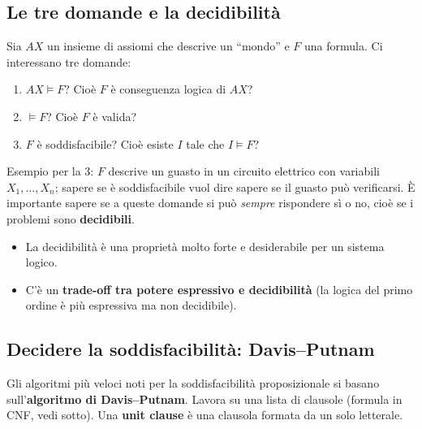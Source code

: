 \subsection{Le tre domande e la decidibilità}

Sia $AX$ un insieme di assiomi che descrive un ``mondo'' e $F$ una formula.
Ci interessano tre domande:
\begin{enumerate}
  \item $AX \models F$? Cioè $F$ è conseguenza logica di $AX$?
  \item $\models F$? Cioè $F$ è valida?
  \item $F$ è soddisfacibile? Cioè esiste $I$ tale che $I \models F$?
\end{enumerate}
Esempio per la 3: $F$ descrive un guasto in un circuito elettrico con
variabili $X_1, \dots, X_n$; sapere se è soddisfacibile vuol dire sapere se il
guasto può verificarsi. È importante sapere se a queste domande si può
\emph{sempre} rispondere sì o no, cioè se i problemi sono \textbf{decidibili}.


\begin{itemize}
  \item La decidibilità è una proprietà molto forte e desiderabile per un
        sistema logico.
  \item C'è un \textbf{trade-off tra potere espressivo e decidibilità} (la
        logica del primo ordine è più espressiva ma non decidibile).
\end{itemize}

\subsection{Decidere la soddisfacibilità: Davis--Putnam}

Gli algoritmi più veloci noti per la soddisfacibilità proposizionale si basano
sull'\textbf{algoritmo di Davis--Putnam}. Lavora su una lista di clausole
(formula in CNF, vedi sotto). Una \textbf{unit clause} è una clausola formata
da un solo letterale.

